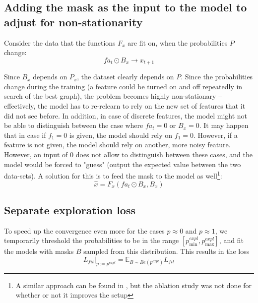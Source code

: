 \documentclass[a4paper,11pt,oneside]{report}
\begin{document}
\subsection{Adding the mask as the input to the model to adjust for non-stationarity}
Consider the data that the functions $F_x$ are fit on, when the probabilities $P$ change:
$$
fa_t\odot B_x\to x_{t+1}
$$

Since $B_x$ depends on $P_x$, the dataset clearly depends on $P$. Since the probabilities change during the training (a feature could be turned on and off repeatedly in search of the best graph), the problem becomes highly non-stationary -- effectively, the model has to re-relearn to rely on the new set of features that it did not see before. In addition, in case of discrete features, the model might not be able to distinguish between the case where $fa_t=0$ or $B_x=0$.
It may happen that in case if $f_1=0$ is given, the model should rely on $f_1=0$. However, if a feature is not given, the model should rely on another, more noisy feature.
However, an input of $0$ does not allow to distinguish between these cases, and the model would be forced to "guess" (output the expected value between the two data-sets).
A solution for this is to feed the mask to the model as well\footnote{A similar approach can be found in \cite{Mooij2016,DeHaan2019}, but the ablation study was not done for whether or not it improves the setup}:
$$
\hat{x}=F_x(fa_t\odot B_x,B_x)
$$

\subsection{Separate exploration loss}
To speed up the convergence even more for the cases $p\approx 0$ and $p\approx 1$, we temporarily threshold the probabilities to be in the range $[p^{expl}_{\min},p^{expl}_{\max}]$, and fit the models with masks $B$ sampled from this distribution. This results in the loss
\begin{equation}
L_{fit}\big|_{p:=p^{expl}}=\mathbb E_{B\sim Be(p^{expl})} L_{fit}
\end{equation}
\end{document}
